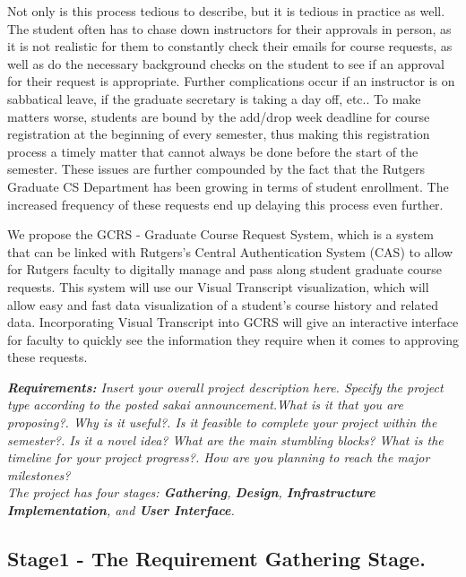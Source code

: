 \documentclass[10pt,conference]{IEEEtran}
\begin{document}
Not only is this process tedious to describe, but it is tedious in practice as well. The student often has to chase down instructors for their approvals in person, as it is not realistic for them to constantly check their emails for course requests, as well as do the necessary background checks on the student to see if an approval for their request is appropriate. Further complications occur if an instructor is on sabbatical leave, if the graduate secretary is taking a day off, etc.. To make matters worse, students are bound by the add/drop week deadline for course registration at the beginning of every semester, thus making this registration process a timely matter that cannot always be done before the start of the semester. These issues are further compounded by the fact that the Rutgers Graduate CS Department has been growing in terms of student enrollment. The increased frequency of these requests end up delaying this process even further. 

We propose the GCRS - Graduate Course Request System, which is a system that can be linked with Rutgers's Central Authentication System (CAS) to allow for Rutgers faculty to digitally manage and pass along student graduate course requests. This system will use our Visual Transcript visualization, which will allow easy and fast data visualization of a student's course history and related data. Incorporating Visual Transcript into GCRS will give an interactive interface for faculty to quickly see the information they require when it comes to approving these requests. 

\textit{\textbf{Requirements:} Insert your overall project description here. Specify the project type according to the posted sakai announcement.What is it that you are proposing?. Why is it useful?. Is it feasible to complete your project within the semester?.  Is it a novel idea?  What are the main stumbling blocks? What is the timeline for your project progress?. How are you planning to reach the major milestones?\\ The project has four stages: \textbf{Gathering}, \textbf{Design}, \textbf{Infrastructure Implementation}, and \textbf{User Interface}.}

%
\subsection{Stage1 - The Requirement Gathering Stage. }\label{sec:1 Requirement Gathering Stage. }

\end{document}
